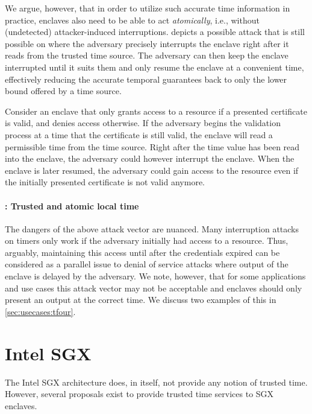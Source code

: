 We argue, however, that in order to utilize such accurate time information in
practice, enclaves also need to be able to act \emph{atomically}, i.e., without
(undetected) attacker-induced interruptions.  depicts a
possible attack that is still possible on \Tthree where the adversary precisely
interrupts the enclave right after it reads from the trusted time source. The
adversary can then keep the enclave interrupted until it suits them and only
resume the enclave at a convenient time, effectively reducing the accurate
temporal guarantees back to only the lower bound offered by a \Ttwo time source.

Consider an enclave that only grants access to a resource if a presented
certificate is valid, and denies access otherwise. If the adversary begins the
validation process at a time that the certificate is still valid, the enclave
will read a permissible time from the time source. Right after the time value
has been read into the enclave, the adversary could however interrupt the
enclave. When the enclave is later resumed, the adversary could gain access to
the resource even if the initially presented certificate is not valid anymore.

\paragraph{\Tfour: Trusted and atomic local time}
The dangers of the above attack vector are nuanced. Many interruption attacks on
\Tthree timers only work if the adversary initially had access to a resource.
Thus, arguably, maintaining this access until after the credentials expired can
be considered as a parallel issue to denial of service attacks where output of
the enclave is delayed by the adversary. We note, however, that for some
applications and use cases this attack vector may not be acceptable and enclaves
should only present an output at the correct time. We discuss two examples of
this in \cref{sec:usecases:tfour}.

\section{Intel SGX}
\label{arch:sgx}

The Intel SGX architecture does, in itself, not provide any notion of trusted
time. However, several proposals exist to provide trusted time services to SGX
enclaves.

